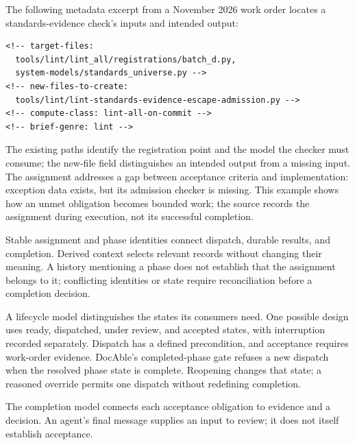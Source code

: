 The following metadata excerpt from a November 2026 work order locates a standards-evidence check's inputs and intended output:

\begin{verbatim}
<!-- target-files:
  tools/lint/lint_all/registrations/batch_d.py,
  system-models/standards_universe.py -->
<!-- new-files-to-create:
  tools/lint/lint-standards-evidence-escape-admission.py -->
<!-- compute-class: lint-all-on-commit -->
<!-- brief-genre: lint -->
\end{verbatim}

The existing paths identify the registration point and the model the checker must consume; the new-file field distinguishes an intended output from a missing input. The assignment addresses a gap between acceptance criteria and implementation: exception data exists, but its admission checker is missing. This example shows how an unmet obligation becomes bounded work; the source records the assignment during execution, not its successful completion.

Stable assignment and phase identities connect dispatch, durable results, and completion. Derived context selects relevant records without changing their meaning. A history mentioning a phase does not establish that the assignment belongs to it; conflicting identities or state require reconciliation before a completion decision.

A lifecycle model distinguishes the states its consumers need. One possible design uses ready, dispatched, under review, and accepted states, with interruption recorded separately. Dispatch has a defined precondition, and acceptance requires work-order evidence. DocAble's completed-phase gate refuses a new dispatch when the resolved phase state is complete. Reopening changes that state; a reasoned override permits one dispatch without redefining completion.

The completion model connects each acceptance obligation to evidence and a decision. An agent's final message supplies an input to review; it does not itself establish acceptance.

